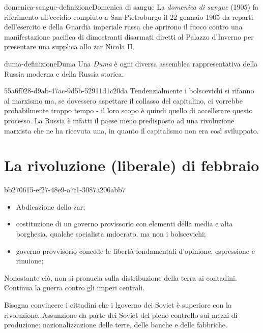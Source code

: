 \documentclass[preview]{standalone}
\begin{document}
\begin{snippetdefinition}{domenica-sangue-definizione}{Domenica di sangue}
    La \textit{domenica di sangue} (1905) fa riferimento all'eccidio compiuto a San Pietroburgo
    il 22 gennaio 1905 da reparti dell'esercito e della Guardia imperiale russa
    che aprirono il fuoco contro una manifestazione pacifica di dimostranti disarmati
    diretti al Palazzo d'Inverno per presentare una supplica allo zar Nicola II. 
\end{snippetdefinition}

\begin{snippetdefinition}{duma-definizione}{Duma}
    Una \textit{Duma} è ogni diversa assemblea rappresentativa della Russia moderna e della Russia storica.
\end{snippetdefinition}

\begin{snippet}{55a6f028-d9ab-47ac-9d5b-52911d1c20da}
    Tendenzialmente i bolscevichi si rifanno al marxismo ma,
    se dovessero aspettare il collasso del capitalino, ci vorrebbe probabilmente troppo
    tempo - il loro scopo è quindi quello di accellerare questo processo.
    La Russia è infatti il paese meno predisposto ad una rivoluzione marxista che ne ha ricevuta una,
    in quanto il capitalismo non era così sviluppato.
\end{snippet}

\section{La rivoluzione (liberale) di febbraio}

\begin{snippet}{bb270615-ef27-48e9-a7f1-3087a206abb7}
    \begin{itemize}
        \item Abdicazione dello zar;
        \item costituzione di un governo provissorio con elementi della media e alta borghesia, qualche socialista mdoerato, ma non i bolscevichi;
        \item governo provvisorio concede le libertà fondamentali d'opinione, espressione e rinuione;
    \end{itemize}
    
    Nonostante ciò, non si pronucia sulla distribuzione della terra ai contadini.
    Continua la guerra contro gli imperi centrali.
    
    
    Bisogna convincere i cittadini che i lgoverno dei Soviet è superiore
    con la rivoluzione.
    Assunzione da parte dei Soviet del pieno controllo sui mezzi di produzione: nazionalizzazione delle terre, delle banche e delle fabbriche.
\end{snippet}
\end{document}
